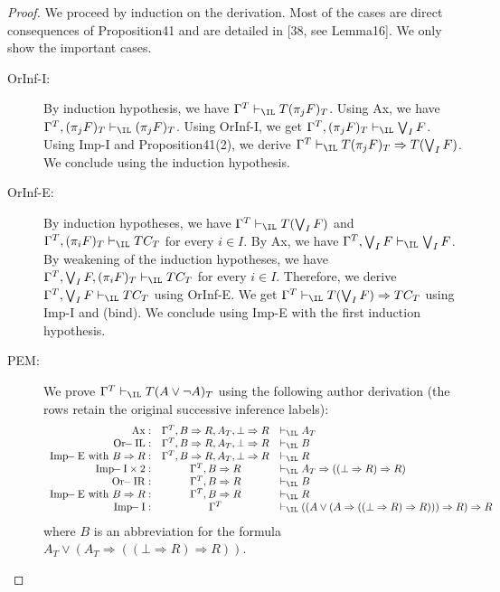 \begin{proof}
We proceed by induction on the derivation. Most of the cases are direct consequences of Proposition41 and are detailed in [38, see Lemma16]. We only show the important cases.
\begin{description}
\item[OrInf-I:] By induction hypothesis, we have $\Gamma^T\vdash_\IL T(\pi_jF)_T$. Using Ax, we have $\Gamma^T,(\pi_jF)_T\vdash_\IL(\pi_jF)_T$. Using OrInf-I, we get $\Gamma^T,(\pi_jF)_T\vdash_\IL\bigvee_I F$. Using Imp-I and Proposition41(2), we derive $\Gamma^T\vdash_\IL T(\pi_jF)_T\Rightarrow T(\bigvee_I F)$. We conclude using the induction hypothesis.
\item[OrInf-E:] By induction hypotheses, we have $\Gamma^T\vdash_\IL T(\bigvee_I F)$ and $\Gamma^T,(\pi_iF)_T\vdash_\IL TC_T$ for every $i\in I$. By Ax, we have $\Gamma^T,\bigvee_I F\vdash_\IL\bigvee_I F$. By weakening of the induction hypotheses, we have $\Gamma^T,\bigvee_I F,(\pi_iF)_T\vdash_\IL TC_T$ for every $i\in I$. Therefore, we derive $\Gamma^T,\bigvee_I F\vdash_\IL TC_T$ using OrInf-E. We get $\Gamma^T\vdash_\IL T(\bigvee_I F)\Rightarrow TC_T$ using Imp-I and (bind). We conclude using Imp-E with the first induction hypothesis.
\item[PEM:] We prove $\Gamma^T\vdash_\IL T(A\vee\neg A)_T$ using the following author derivation (the rows retain the original successive inference labels):
\[\begin{array}{rcl}\mathrm{Ax}:&\Gamma^T,B\Rightarrow R,A_T,\bot\Rightarrow R&\vdash_\IL A_T\\\mathrm{Or\!\!-IL}:&\Gamma^T,B\Rightarrow R,A_T,\bot\Rightarrow R&\vdash_\IL B\\\mathrm{Imp\!\!-E\ with}\ B\Rightarrow R:&\Gamma^T,B\Rightarrow R,A_T,\bot\Rightarrow R&\vdash_\IL R\\\mathrm{Imp\!\!-I}\times2:&\Gamma^T,B\Rightarrow R&\vdash_\IL A_T\Rightarrow((\bot\Rightarrow R)\Rightarrow R)\\\mathrm{Or\!\!-IR}:&\Gamma^T,B\Rightarrow R&\vdash_\IL B\\\mathrm{Imp\!\!-E\ with}\ B\Rightarrow R:&\Gamma^T,B\Rightarrow R&\vdash_\IL R\\\mathrm{Imp\!\!-I}:&\Gamma^T&\vdash_\IL((A\vee(A\Rightarrow((\bot\Rightarrow R)\Rightarrow R)))\Rightarrow R)\Rightarrow R\end{array}\]
where $B$ is an abbreviation for the formula $A_T\vee(A_T\Rightarrow((\bot\Rightarrow R)\Rightarrow R))$.
\end{description}
\end{proof}
